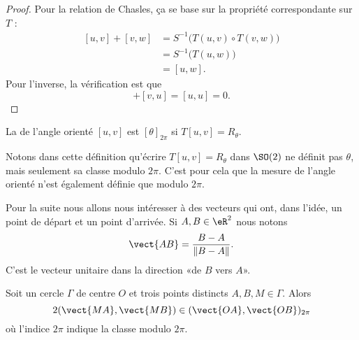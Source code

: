 \begin{proof}
    Pour la relation de Chasles, ça se base sur la propriété correspondante sur \( T\) :
    \begin{subequations}
        \begin{align}
            [u,v]+[v,w]&=S^{-1}\Big( T(u,v)\circ T(v,w) \Big)\\
            &=S^{-1}\big( T(u,w) \big)\\
            &=[u,w].
        \end{align}
    \end{subequations}
    Pour l'inverse, la vérification est que
    \begin{equation}
        [u,v]+[v,u]=[u,u]=0.
    \end{equation}
\end{proof}

\begin{definition}
    La  de l'angle orienté \( [u,v]\) est \( [\theta]_{2\pi}\) si \( T[u,v]=R_{\theta}\).
\end{definition}
Notons dans cette définition qu'écrire \( T[u,v]=R_{\theta}\) dans \( \SO(2)\) ne définit pas \( \theta\), mais seulement sa classe modulo \( 2\pi\). C'est pour cela que la mesure de l'angle orienté n'est également définie que modulo \( 2\pi\).

Pour la suite nous allons nous intéresser à des vecteurs qui ont, dans l'idée, un point de départ et un point d'arrivée. Si \( A,B\in \eR^2\) nous notons
\begin{equation}
    \vect{ AB }=\frac{ B-A }{ \| B-A \| }.
\end{equation}
C'est le vecteur unitaire dans la direction «de \( B\) vers $A$».

\begin{theorem}       \label{THOooQDNKooTlVmmj}
    Soit un cercle \( \Gamma\) de centre \( O\) et trois points distincts \( A,B,M\in \Gamma\). Alors
    \begin{equation}
        2(\vect{ MA },\vect{ MB })\in (\vect{ OA },\vect{ OB })_{2\pi}
    \end{equation}
    où l'indice \( 2\pi\) indique la classe modulo \( 2\pi\).
\end{theorem}

